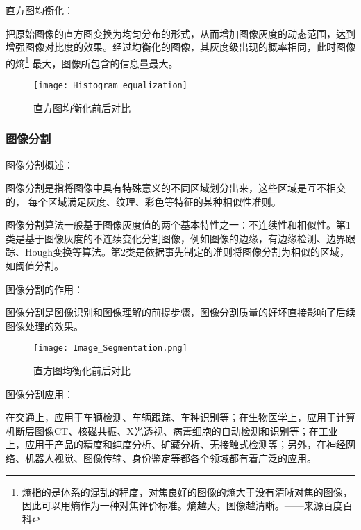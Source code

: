 直方图均衡化：

把原始图像的直方图变换为均匀分布的形式，从而增加图像灰度的动态范围，达到增强图像对比度的效果。经过均衡化的图像，其灰度级出现的概率相同，此时图像的熵\footnote{熵指的是体系的混乱的程度，对焦良好的图像的熵大于没有清晰对焦的图像，因此可以用熵作为一种对焦评价标准。熵越大，图像越清晰。——来源百度百科}
最大，图像所包含的信息量最大。

\begin{figure}[htbp]
    \label{gra1}
    \begin{center}
        \texttt{[image: Histogram\_equalization]}
        \caption{直方图均衡化前后对比}
    \end{center}
\end{figure}


\subsubsection{图像分割}

图像分割概述：

图像分割是指将图像中具有特殊意义的不同区域划分出来，这些区域是互不相交的， 每个区域满足灰度、纹理、彩色等特征的某种相似性准则。

图像分割算法一般基于图像灰度值的两个基本特性之一：不连续性和相似性。第1类是基于图像灰度的不连续变化分割图像，例如图像的边缘，有边缘检测、边界跟踪、Hough变换等算法。第2类是依据事先制定的准则将图像分割为相似的区域，如阈值分割。

图像分割的作用：

图像分割是图像识别和图像理解的前提步骤，图像分割质量的好坏直接影响了后续图像处理的效果。

\begin{figure}[htbp]
    \label{gra1}
    \begin{center}
        \texttt{[image: Image\_Segmentation.png]}
        \caption{直方图均衡化前后对比}
    \end{center}
\end{figure}


图像分割应用：

在交通上，应用于车辆检测、车辆跟踪、车种识别等；在生物医学上，应用于计算机断层图像CT、核磁共振、X光透视、病毒细胞的自动检测和识别等；在工业上，应用于产品的精度和纯度分析、矿藏分析、无接触式检测等；另外，在神经网络、机器人视觉、图像传输、身份鉴定等都各个领域都有着广泛的应用。


